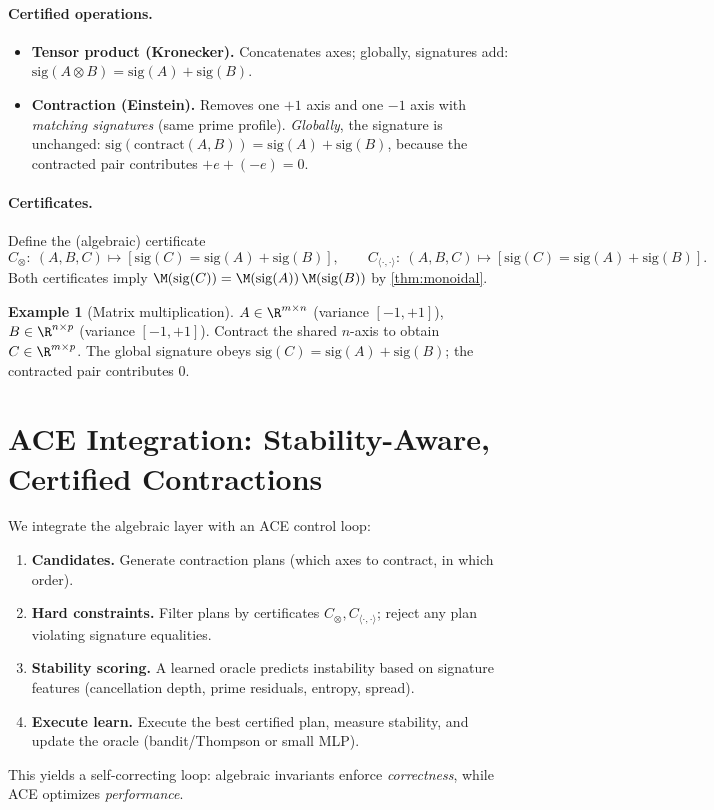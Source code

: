 \documentclass[11pt]{article}
\theoremstyle{definition}
\newtheorem{example}[definition]{Example}
\theoremstyle{plain}
\theoremstyle{remark}
\begin{document}
\paragraph{Certified operations.}
\begin{itemize}[leftmargin=*]
  \item \textbf{Tensor product (Kronecker).} Concatenates axes; globally, signatures add: $\mathrm{sig}(A\otimes B)=\mathrm{sig}(A)+\mathrm{sig}(B)$.
  \item \textbf{Contraction (Einstein).} Removes one $+1$ axis and one $-1$ axis with \emph{matching signatures} (same prime profile). \emph{Globally}, the signature is unchanged:
  $\mathrm{sig}(\mathrm{contract}(A,B))=\mathrm{sig}(A)+\mathrm{sig}(B)$, because the contracted pair contributes $+e+(-e)=0$.
\end{itemize}

\paragraph{Certificates.} Define the (algebraic) certificate
\[
  C_{\otimes}:\ (A,B,C)\mapsto [\mathrm{sig}(C)=\mathrm{sig}(A)+\mathrm{sig}(B)],\qquad
  C_{\langle\cdot,\cdot\rangle}:\ (A,B,C)\mapsto [\mathrm{sig}(C)=\mathrm{sig}(A)+\mathrm{sig}(B)].
\]
Both certificates imply $\M(\mathrm{sig}(C))=\M(\mathrm{sig}(A))\,\M(\mathrm{sig}(B))$ by \cref{thm:monoidal}.

\begin{example}[Matrix multiplication]
$A\in\R^{m\times n}$ (variance $[-1,+1]$), $B\in\R^{n\times p}$ (variance $[-1,+1]$). Contract the shared $n$-axis to obtain $C\in\R^{m\times p}$. The global signature obeys $\mathrm{sig}(C)=\mathrm{sig}(A)+\mathrm{sig}(B)$; the contracted pair contributes $0$.
\end{example}

\section{ACE Integration: Stability-Aware, Certified Contractions}
\label{sec:ace}
We integrate the algebraic layer with an ACE control loop:
\begin{enumerate}[leftmargin=*]
  \item \textbf{Candidates.} Generate contraction plans (which axes to contract, in which order).
  \item \textbf{Hard constraints.} Filter plans by certificates $C_{\otimes},C_{\langle\cdot,\cdot\rangle}$; reject any plan violating signature equalities.
  \item \textbf{Stability scoring.} A learned oracle predicts instability based on signature features (cancellation depth, prime residuals, entropy, spread).
  \item \textbf{Execute \/ learn.} Execute the best certified plan, measure stability, and update the oracle (bandit/Thompson or small MLP).
\end{enumerate}
This yields a self-correcting loop: algebraic invariants enforce \emph{correctness}, while ACE optimizes \emph{performance}.
\end{document}
